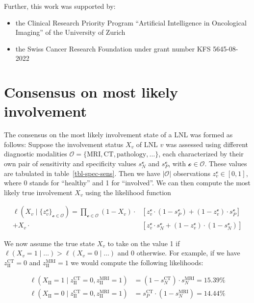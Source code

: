 \documentclass[
  sn-mathphys-num,
]{sn-jnl}
\providecommand{\tightlist}{%
  \setlength{\itemsep}{0pt}\setlength{\parskip}{0pt}}\usepackage{longtable,booktabs,array}
\begin{document}
Further, this work was supported by:

\begin{itemize}
\tightlist
\item
  the Clinical Research Priority Program ``Artificial Intelligence in
  Oncological Imaging'' of the University of Zurich
\item
  the Swiss Cancer Research Foundation under grant number KFS
  5645-08-2022
\end{itemize}

\section{Consensus on most likely involvement}\label{sec-consensus}

The consensus on the most likely involvement state of a LNL was formed
as follows: Suppose the involvement status \(X_v\) of LNL \(v\) was
assessed using different diagnostic modalities
\(\mathcal{O} = \{ \text{MRI}, \text{CT}, \text{pathology}, \ldots \}\),
each characterized by their own pair of sensitivity and specificity
values \(s_N^{\mathcal{o}}\) and \(s_P^{\mathcal{o}}\), with
\(\mathcal{o} \in \mathcal{O}\). These values are tabulated in
table~\ref{tbl-spec-sens}. Then we have \(|\mathcal{O}|\) observations
\(z_v^{\mathcal{o}} \in \left[ 0, 1 \right]\), where 0 stands for
``healthy'' and 1 for ``involved''. We can then compute the most likely
true involvement \(X_v\) using the likelihood function

\[
\begin{aligned}
\ell \left( X_v \mid \{ z_v^{\mathcal{o}} \}_{\mathcal{o} \in \mathcal{O}} \right) = \prod_{\mathcal{o} \in \mathcal{O}}
\left( 1 - X_v \right) \cdot &\left[ z_v^{\mathcal{o}} \cdot \left( 1 - s_P^{\mathcal{o}} \right) + \left( 1 - z_v^{\mathcal{o}} \right) \cdot s_P^{\mathcal{o}} \right] \\
+ X_v \cdot &\left[ z_v^{\mathcal{o}} \cdot s_N^{\mathcal{o}} + \left( 1 - z_v^{\mathcal{o}} \right) \cdot (1 - s_N^{\mathcal{o}}) \right]
\end{aligned}
\]

We now assume the true state \(X_v\) to take on the value 1 if
\(\ell \left( X_v = 1 \mid \ldots \right) > \ell \left( X_v = 0 \mid \ldots \right)\)
and 0 otherwise. For example, if we have \(z_\text{II}^\text{CT} = 0\)
and \(z_\text{II}^\text{MRI} = 1\) we would compute the following
likelihoods:

\[
\begin{aligned}
\ell \left( X_\text{II} = 1 \mid z_\text{II}^\text{CT} = 0, z_\text{II}^\text{MRI} = 1 \right) &= \left( 1 - s_N^\text{CT} \right) \cdot s_N^\text{MRI} = 15.39\% \\
\ell \left( X_\text{II} = 0 \mid z_\text{II}^\text{CT} = 0, z_\text{II}^\text{MRI} = 1 \right) &= s_P^\text{CT} \cdot \left(1 - s_N^\text{MRI}\right) = 14.44\%
\end{aligned}
\]
\end{document}
